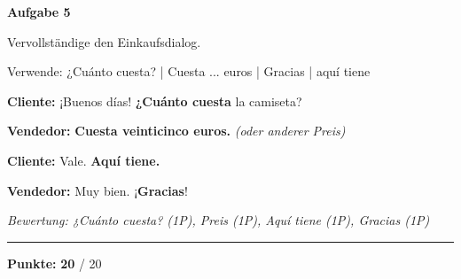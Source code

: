 \documentclass[11pt, a4paper]{article}
\newcommand{\fachfarbe}{spanisch}
\newcommand{\maxpunkte}{20}
\newcommand{\punktebox}[1]{\hfill\fbox{\small \_/#1}}
\newcommand{\loesung}[1]{\textcolor{loesung}{\textbf{#1}}}
\newenvironment{aufgabe}[1]{%
    \needspace{5\baselineskip}%
    \nopagebreak[4]%
    \vspace{10pt}
    \noindent\textbf{\textcolor{\fachfarbe}{Aufgabe #1}}
    \nopagebreak[4]%
    \vspace{5pt}
    \nopagebreak[4]%
    \begin{list}{}{\leftmargin=0pt}
    \item[]
}{%
    \end{list}
}
\begin{document}
\vspace{15pt}


\begin{aufgabe}{5}
Vervollständige den Einkaufsdialog. \punktebox{4}
\end{aufgabe}

\begin{hinweis}
Verwende: ¿Cuánto cuesta? | Cuesta ... euros | Gracias | aquí tiene
\end{hinweis}

\vspace{0.5em}

\noindent
\textbf{Cliente:} ¡Buenos días! \loesung{¿Cuánto cuesta} la camiseta?

\textbf{Vendedor:} \loesung{Cuesta veinticinco euros.} \textit{(oder anderer Preis)}

\textbf{Cliente:} Vale. \loesung{Aquí tiene.}

\textbf{Vendedor:} Muy bien. ¡\loesung{Gracias}!

\vspace{0.5em}
\textit{\textcolor{grau}{Bewertung: ¿Cuánto cuesta? (1P), Preis (1P), Aquí tiene (1P), Gracias (1P)}}

\vspace{20pt}


\hrule
\vspace{10pt}

\begin{flushright}
\textbf{Punkte:} \loesung{\maxpunkte} / \maxpunkte
\end{flushright}
\end{document}
